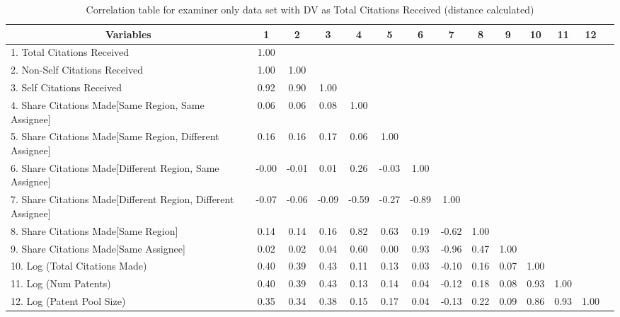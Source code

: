 \begin{table}[htbp]\centering \caption{Correlation table for examiner only data set with DV as Total Citations Received (distance calculated)\label{e.tcorrelation}}
\footnotesize
\begin{adjustbox}{angle=90}
\begin{tabular}{l  c  c  c  c  c  c  c  c  c  c  c  c  c }\hline\hline
\multicolumn{1}{c}{Variables} &1&2&3&4&5&6&7&8&9&10&11&12\\ \hline
1. Total Citations Received&1.00\\
2. Non-Self Citations Received&1.00&1.00\\
3. Self Citations Received&0.92&0.90&1.00\\
4. Share Citations Made[Same Region, Same Assignee]&0.06&0.06&0.08&1.00\\
5. Share Citations Made[Same Region, Different Assignee]&0.16&0.16&0.17&0.06&1.00\\
6. Share Citations Made[Different Region, Same Assignee]&-0.00&-0.01&0.01&0.26&-0.03&1.00\\
7. Share Citations Made[Different Region, Different Assignee]&-0.07&-0.06&-0.09&-0.59&-0.27&-0.89&1.00\\
8. Share Citations Made[Same Region]&0.14&0.14&0.16&0.82&0.63&0.19&-0.62& 1.00\\
9. Share Citations Made[Same Assignee]&0.02&0.02&0.04&0.60&0.00&0.93&-0.96& 0.47&1.00\\
10. Log (Total Citations Made)&0.40&0.39&0.43&0.11&0.13&0.03&-0.10&  0.16&0.07&1.00\\
11. Log (Num Patents)&0.40&0.39&0.43&0.13&0.14&0.04&-0.12&  0.18&0.08&0.93&1.00\\
12. Log (Patent Pool Size)&0.35&0.34&0.38&0.15&0.17&0.04&-0.13& 0.22&0.09&0.86&0.93&1.00\\
\hline \hline 
 \end{tabular}
 \end{adjustbox}
\end{table}
